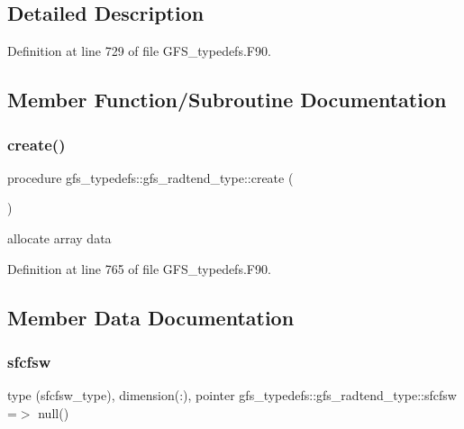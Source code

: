 \subsection{Detailed Description}


Definition at line 729 of file G\+F\+S\+\_\+typedefs.\+F90.



\subsection{Member Function/\+Subroutine Documentation}
\mbox{\label{structgfs__typedefs_1_1gfs__radtend__type_adceb0608c6d5b113a11c3b0acc9d9398}} 
\subsubsection{create()}
{\footnotesize\ttfamily procedure gfs\+\_\+typedefs\+::gfs\+\_\+radtend\+\_\+type\+::create (\begin{DoxyParamCaption}{ }\end{DoxyParamCaption})}



allocate array data 



Definition at line 765 of file G\+F\+S\+\_\+typedefs.\+F90.



\subsection{Member Data Documentation}
\mbox{\label{structgfs__typedefs_1_1gfs__radtend__type_a0ef29a10cf77570a1648c8fbf18b87b5}} 
\subsubsection{sfcfsw}
{\footnotesize\ttfamily type (sfcfsw\+\_\+type), dimension(\+:), pointer gfs\+\_\+typedefs\+::gfs\+\_\+radtend\+\_\+type\+::sfcfsw =$>$ null()}



